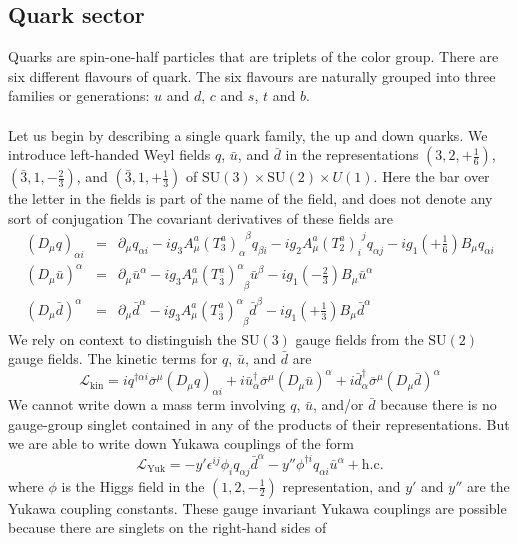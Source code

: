 \subsection{Quark sector}
Quarks are spin-one-half particles that are triplets of the color group. There are six different flavours of quark. The six flavours are naturally grouped into three families or generations: $u$ and $d$, $c$ and $s$, $t$ and $b$.
\\ \\
Let us begin by describing a single quark family, the up and down quarks. We introduce left-handed Weyl fields $q$, $\bar{u}$, and $\bar{d}$ in the representations
$(3,2,+\frac{1}{6})$, $(\bar{3},1,-\frac{2}{3})$, and $(\bar{3},1,+\frac{1}{3})$ of $\mathrm{SU}(3) \times \mathrm{SU}(2) \times U(1)$. 
Here the bar over the letter in the fields is part of the name of the field, and does not denote any sort of conjugation
The covariant derivatives of these fields are
\begin{eqnarray}
(D_{\mu}q)_{\alpha i} &=& \partial_{\mu}q_{\alpha i} - ig_3A^a_{\mu}(T^a_3)_{\alpha}^{\phantom{\alpha}\beta} q_{\beta i} - ig_2A^a_{\mu}(T^a_2)_{i}^{\phantom{j}j} q_{\alpha j} - ig_1(+\frac{1}{6})B_{\mu} q_{\alpha i}
\nonumber \\
(D_{\mu}\bar{u})^{\alpha} &=& \partial_{\mu}\bar{u}^{\alpha} -ig_3A^a_{\mu}(T^a_{\bar{3}})^{\alpha}_{\phantom{\alpha}\beta} \bar{u}^{\beta } - ig_1(-\frac{2}{3})B_{\mu}\bar{u}^{\alpha}
\nonumber \\
(D_{\mu}\bar{d})^{\alpha} &=& \partial_{\mu}\bar{d}^{\alpha} -ig_3A^a_{\mu}(T^a_{\bar{3}})^{\alpha}_{\phantom{\alpha}\beta} \bar{d}^{\beta } - ig_1(+\frac{1}{3})B_{\mu}\bar{d}^{\alpha}
\nonumber
\end{eqnarray}
We rely on context to distinguish the $\mathrm{SU}(3)$ gauge fields from the $\mathrm{SU}(2)$ gauge fields. The kinetic terms for $q$, $\bar{u}$, and $\bar{d}$ are
\[\mathcal{L}_{\mathrm{kin}} = iq^{\dagger \alpha i} \overline{\sigma}^{\mu} (D_{\mu}q)_{\alpha i} + i\bar{u}^{\dagger}_{\alpha}\overline{\sigma}^{\mu}(D_{\mu}\bar{u})^{\alpha} + i\bar{d}^{\dagger}_{\alpha}\overline{\sigma}^{\mu}(D_{\mu}\bar{d})^{\alpha}\]
We cannot write down a mass term involving $q$, $\bar{u}$, and/or $\bar{d}$ because there is no gauge-group singlet contained in any of the products of their representations. But we are able to write down Yukawa couplings of the form
\[\mathcal{L}_{\mathrm{Yuk}} = -y'\epsilon^{ij}\phi_i q_{\alpha j} \bar{d}^{\alpha} - y'' \phi^{\dagger i}q_{\alpha i} \bar{u}^{\alpha} + \mathrm{h.c.}\]
where $\phi$ is the Higgs field in the $(1,2,-\frac{1}{2})$ representation, and $y'$ and $y''$ are the Yukawa coupling constants. These gauge invariant Yukawa couplings are possible because there are singlets on the right-hand sides of
